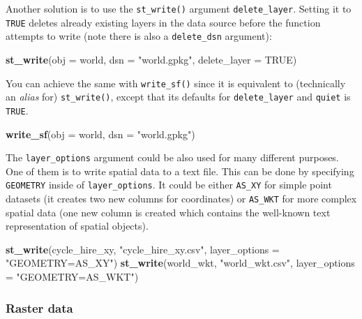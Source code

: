 \documentclass[]{krantz}
\newenvironment{Shaded}{\begin{snugshade}}{\end{snugshade}}
\newcommand{\DataTypeTok}[1]{\textcolor[rgb]{0.27,0.27,0.27}{#1}}
\newcommand{\KeywordTok}[1]{\textcolor[rgb]{0.27,0.27,0.27}{\textbf{#1}}}
\newcommand{\NormalTok}[1]{#1}
\newcommand{\OtherTok}[1]{\textcolor[rgb]{0.37,0.37,0.37}{#1}}
\newcommand{\StringTok}[1]{\textcolor[rgb]{0.5,0.5,0.5}{#1}}
\begin{document}
Another solution is to use the \texttt{st\_write()} argument \texttt{delete\_layer}. Setting it to \texttt{TRUE} deletes already existing layers in the data source before the function attempts to write (note there is also a \texttt{delete\_dsn} argument):

\begin{Shaded}
\begin{Highlighting}[]
\KeywordTok{st_write}\NormalTok{(}\DataTypeTok{obj =}\NormalTok{ world, }\DataTypeTok{dsn =} \StringTok{"world.gpkg"}\NormalTok{, }\DataTypeTok{delete_layer =} \OtherTok{TRUE}\NormalTok{)}
\end{Highlighting}
\end{Shaded}

You can achieve the same with \texttt{write\_sf()} since it is equivalent to (technically an \emph{alias} for) \texttt{st\_write()}, except that its defaults for \texttt{delete\_layer} and \texttt{quiet} is \texttt{TRUE}.

\begin{Shaded}
\begin{Highlighting}[]
\KeywordTok{write_sf}\NormalTok{(}\DataTypeTok{obj =}\NormalTok{ world, }\DataTypeTok{dsn =} \StringTok{"world.gpkg"}\NormalTok{)}
\end{Highlighting}
\end{Shaded}

The \texttt{layer\_options} argument could be also used for many different purposes.
One of them is to write spatial data to a text file.
This can be done by specifying \texttt{GEOMETRY} inside of \texttt{layer\_options}.
It could be either \texttt{AS\_XY} for simple point datasets (it creates two new columns for coordinates) or \texttt{AS\_WKT} for more complex spatial data (one new column is created which contains the well-known text representation of spatial objects).

\begin{Shaded}
\begin{Highlighting}[]
\KeywordTok{st_write}\NormalTok{(cycle_hire_xy, }\StringTok{"cycle_hire_xy.csv"}\NormalTok{, }\DataTypeTok{layer_options =} \StringTok{"GEOMETRY=AS_XY"}\NormalTok{)}
\KeywordTok{st_write}\NormalTok{(world_wkt, }\StringTok{"world_wkt.csv"}\NormalTok{, }\DataTypeTok{layer_options =} \StringTok{"GEOMETRY=AS_WKT"}\NormalTok{)}
\end{Highlighting}
\end{Shaded}

\hypertarget{raster-data-2}{%
\subsubsection{Raster data}\label{raster-data-2}}
\end{document}
